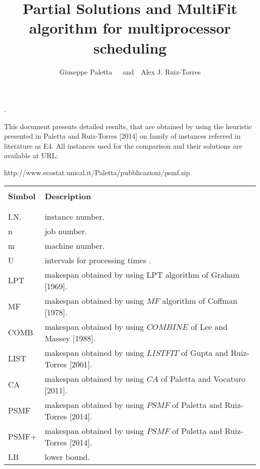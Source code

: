 \documentclass[12pt,a4paper]{article}
\title{\bf
Partial Solutions and MultiFit algorithm for multiprocessor
scheduling}
\author{Giuseppe Paletta\footnotemark[1]~~~and~~Alex J. Ruiz-Torres \footnotemark[2]}
\begin{document}
\maketitle

\renewcommand{\thefootnote}{\fnsymbol{footnote}}

. 
\renewcommand{\thefootnote}{\fnsymbol{footnote}}

This document presents detailed results, that are obtained by using
the heuristic presented in Paletta and Ruiz-Torres [2014] on family
of instances referred in literature as E4. All instances used for
the comparison and their solutions are available at URL:
\begin{center}
http://www.ecostat.unical.it/Paletta/pubblicazioni/psmf.zip
\end{center}

\begin{tabular}{l l}\hline
        &  \\[0.03in]
{\bf Simbol} &  {\bf Description} \\[0.03in]
        &  \\[0.03in]\hline
        &  \\[0.03in]
I.N.  & instance number. \\[0.03in]
n       & job number.    \\[0.03in]
m       & machine number. \\[0.03in]
U       & intervals for processing times . \\[0.03in]
LPT      & makespan obtained by using LPT algorithm of Graham [1969]. \\[0.03in]
MF      & makespan obtained by using $MF$ algorithm of Coffman [1978].\\[0.03in]
COMB      & makespan obtained by using $COMBINE$ of Lee and Massey [1988]. \\[0.03in]
LIST      & makespan obtained by using $LISTFIT$ of Gupta and Ruiz-Torres [2001]. \\[0.03in]
CA      & makespan obtained by using  $CA$ of Paletta and Vocaturo [2011].\\[0.03in]
PSMF      & makespan obtained by using  $PSMF$ of Paletta and Ruiz-Torres [2014]. \\[0.03in]
PSMF+     & makespan obtained by using $PSMF$ of Paletta and Ruiz-Torres [2014]. \\[0.03in]
LB      & lower bound. \\[0.03in]

\end{tabular}
\end{document}
